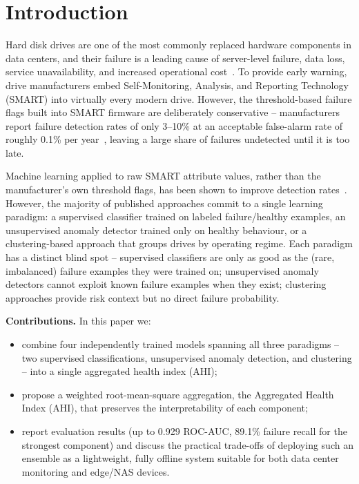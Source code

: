 \documentclass[sigconf,natbib=false, language=english]{acmart}
\begin{document}
\maketitle

\section{Introduction}
\label{sec:introduction}

Hard disk drives are one of the most commonly replaced hardware components in data centers, and their failure is a leading cause of server-level failure, data loss, service unavailability, and increased operational cost~\cite{TODO:lu2020smarter}. To provide early warning, drive manufacturers embed Self-Monitoring, Analysis, and Reporting Technology (SMART) into virtually every modern drive. However, the threshold-based failure flags built into SMART firmware are deliberately conservative -- manufacturers report failure detection rates of only 3--10\% at an acceptable false-alarm rate of roughly 0.1\% per year~\cite{TODO:murray2005}, leaving a large share of failures undetected until it is too late.

Machine learning applied to raw SMART attribute values, rather than the manufacturer's own threshold flags, has been shown to improve detection rates~\cite{TODO:murray2005,TODO:lu2020smarter}. However, the majority of published approaches commit to a single learning paradigm: a supervised classifier trained on labeled failure/healthy examples, an unsupervised anomaly detector trained only on healthy behaviour, or a clustering-based approach that groups drives by operating regime. Each paradigm has a distinct blind spot -- supervised classifiers are only as good as the (rare, imbalanced) failure examples they were trained on; unsupervised anomaly detectors cannot exploit known failure examples when they exist; clustering approaches provide risk context but no direct failure probability.

\textbf{Contributions.} In this paper we:
\begin{itemize}
    \item combine four independently trained models spanning all three paradigms -- two supervised classifications, unsupervised anomaly detection, and clustering -- into a single aggregated health index (AHI);
    \item propose a weighted root-mean-square aggregation, the Aggregated Health Index (AHI), that preserves the interpretability of each component;
    \item report evaluation results (up to 0.929 ROC-AUC, 89.1\% failure recall for the strongest component) and discuss the practical trade-offs of deploying such an ensemble as a lightweight, fully offline system suitable for both data center monitoring and edge/NAS devices.
\end{itemize}
\end{document}
